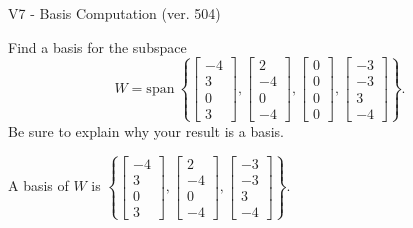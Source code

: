 \begin{exercise}
  \begin{exerciseTitle}V7 - Basis Computation (ver. 504)\end{exerciseTitle}
  \begin{exerciseStatement}
    Find a basis for the subspace 
\[W=\mathrm{span}\ \left\{\left[\begin{array}{r}
-4 \\
3 \\
0 \\
3
\end{array}\right] , \left[\begin{array}{r}
2 \\
-4 \\
0 \\
-4
\end{array}\right] , \left[\begin{array}{r}
0 \\
0 \\
0 \\
0
\end{array}\right] , \left[\begin{array}{r}
-3 \\
-3 \\
3 \\
-4
\end{array}\right]\right\}.\]
 Be sure to explain why your result is a basis.


  \end{exerciseStatement}
  \begin{exerciseAnswer}
   A basis of \(W\) is  \(\left\{\left[\begin{array}{r}
-4 \\
3 \\
0 \\
3
\end{array}\right] , \left[\begin{array}{r}
2 \\
-4 \\
0 \\
-4
\end{array}\right] , \left[\begin{array}{r}
-3 \\
-3 \\
3 \\
-4
\end{array}\right]\right\}\).
  


  \end{exerciseAnswer}
\end{exercise}